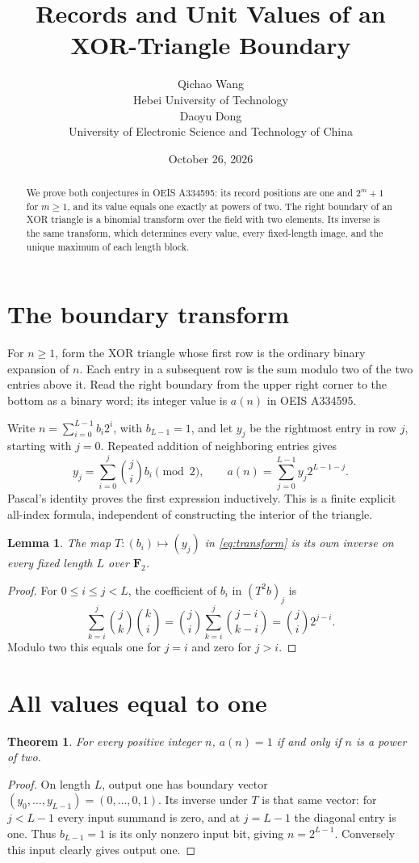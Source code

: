 \documentclass[10pt]{article}
\title{Records and Unit Values of an XOR-Triangle Boundary}
\author{Qichao Wang\\{\small Hebei University of Technology}\\[0.3em]
Daoyu Dong\\{\small University of Electronic Science and Technology of China}}
\date{October 26, 2026}
\newtheorem{theorem}{Theorem}
\newtheorem{lemma}{Lemma}
\begin{document}
\maketitle
\begin{abstract}
We prove both conjectures in OEIS A334595: its record positions are
one and $2^m+1$ for $m\ge1$, and its value equals one exactly at
powers of two. The right boundary of an XOR triangle is a
binomial transform over the field with two elements. Its inverse
is the same transform, which determines every value, every
fixed-length image, and the unique maximum of each length block.
\end{abstract}

\section{The boundary transform}
For $n\ge1$, form the XOR triangle whose first row is the ordinary
binary expansion of $n$. Each entry in a subsequent row is the
sum modulo two of the two entries above it. Read the right boundary
from the upper right corner to the bottom as a binary word;
its integer value is $a(n)$ in OEIS A334595.

Write $n=\sum_{i=0}^{L-1}b_i2^i$, with $b_{L-1}=1$, and let
$y_j$ be the rightmost entry in row $j$, starting with $j=0$.
Repeated addition of neighboring entries gives
\begin{equation}\label{eq:transform}
 y_j=\sum_{i=0}^{j}\binom ji b_i\pmod2,
 \qquad
 a(n)=\sum_{j=0}^{L-1}y_j2^{L-1-j}.
\end{equation}
Pascal's identity proves the first expression inductively.
This is a finite explicit all-index formula, independent of
constructing the interior of the triangle.

\begin{lemma}\label{lem:inverse}
The map $T:(b_i)\mapsto(y_j)$ in \eqref{eq:transform} is its own
inverse on every fixed length $L$ over $\mathbf F_2$.
\end{lemma}
\begin{proof}
For $0\le i\le j<L$, the coefficient of $b_i$ in $(T^2b)_j$ is
\[
 \sum_{k=i}^j\binom jk\binom ki
 =\binom ji\sum_{k=i}^j\binom{j-i}{k-i}
 =\binom ji2^{j-i}.
\]
Modulo two this equals one for $j=i$ and zero for $j>i$.
\end{proof}

\section{All values equal to one}
\begin{theorem}
For every positive integer $n$, $a(n)=1$ if and only if $n$ is a
power of two.
\end{theorem}
\begin{proof}
On length $L$, output one has boundary vector
$(y_0,\ldots,y_{L-1})=(0,\ldots,0,1)$.
Its inverse under $T$ is that same vector: for $j<L-1$ every
input summand is zero, and at $j=L-1$ the diagonal entry is one.
Thus $b_{L-1}=1$ is its only nonzero input bit, giving
$n=2^{L-1}$. Conversely this input clearly gives output one.
\end{proof}
\end{document}
